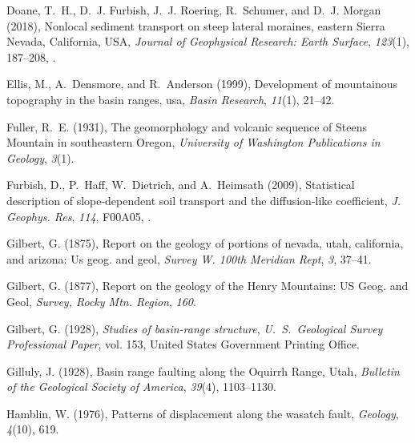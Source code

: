 \begin{thebibliography}{41}
Doane, T.~H., D.~J. Furbish, J.~J. Roering, R.~Schumer, and D.~J. Morgan
  (2018), {Nonlocal sediment transport on steep lateral moraines, eastern
  Sierra Nevada, California, USA}, \textit{Journal of Geophysical Research:
  Earth Surface}, \textit{123}(1), 187--208, .

Ellis, M., A.~Densmore, and R.~Anderson (1999), Development of mountainous
  topography in the basin ranges, usa, \textit{Basin Research}, \textit{11}(1),
  21--42.

Fuller, R.~E. (1931), {The geomorphology and volcanic sequence of Steens
  Mountain in southeastern Oregon}, \textit{University of Washington
  Publications in Geology}, \textit{3}(1).

Furbish, D., P.~Haff, W.~Dietrich, and A.~Heimsath (2009), Statistical
  description of slope-dependent soil transport and the diffusion-like
  coefficient, \textit{J. Geophys. Res}, \textit{114}, F00A05,
  .

Gilbert, G. (1875), Report on the geology of portions of nevada, utah,
  california, and arizona: Us geog. and geol, \textit{Survey W. 100th Meridian
  Rept}, \textit{3}, 37--41.

Gilbert, G. (1877), {Report on the geology of the Henry Mountains: US Geog. and
  Geol}, \textit{Survey, Rocky Mtn. Region}, \textit{160}.

Gilbert, G. (1928), \textit{Studies of basin-range structure}, \textit{U.~S.\
  Geological Survey Professional Paper}, vol. 153, United States Government
  Printing Office.

Gilluly, J. (1928), {Basin range faulting along the Oquirrh Range, Utah},
  \textit{Bulletin of the Geological Society of America}, \textit{39}(4),
  1103--1130.

Hamblin, W. (1976), Patterns of displacement along the wasatch fault,
  \textit{Geology}, \textit{4}(10), 619.


\end{thebibliography}
